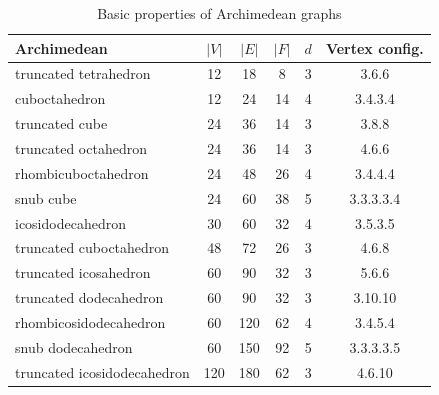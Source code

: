 \begin{table}[H]
\centering
\begin{tabular}{l@{\hspace{1.5cm}}ccccc}
\toprule
\textbf{Archimedean} & \textbf{$|V|$} & \textbf{$|E|$} & \textbf{$|F|$} & \textbf{$d$} & \textbf{Vertex config.} \\
\midrule
truncated tetrahedron & 12 & 18 & 8 & 3 & 3.6.6 \\
cuboctahedron & 12 & 24 & 14 & 4 & 3.4.3.4 \\
truncated cube & 24 & 36 & 14 & 3 & 3.8.8 \\
truncated octahedron & 24 & 36 & 14 & 3 & 4.6.6 \\
rhombicuboctahedron & 24 & 48 & 26 & 4 & 3.4.4.4 \\
snub cube & 24 & 60 & 38 & 5 & 3.3.3.3.4 \\
icosidodecahedron & 30 & 60 & 32 & 4 & 3.5.3.5 \\
truncated cuboctahedron & 48 & 72 & 26 & 3 & 4.6.8 \\
truncated icosahedron & 60 & 90 & 32 & 3 & 5.6.6 \\
truncated dodecahedron & 60 & 90 & 32 & 3 & 3.10.10 \\
rhombicosidodecahedron & 60 & 120 & 62 & 4 & 3.4.5.4 \\
snub dodecahedron & 60 & 150 & 92 & 5 & 3.3.3.3.5 \\
truncated icosidodecahedron & 120 & 180 & 62 & 3 & 4.6.10 \\
\bottomrule
\end{tabular}
\caption{Basic properties of Archimedean graphs}
\label{tab:archimedean-basic-props}
\end{table}